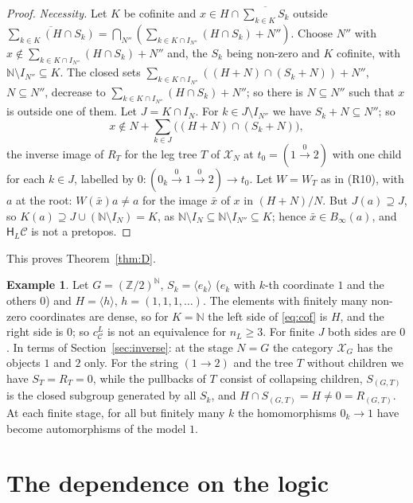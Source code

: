 \documentclass[11pt]{amsart}
\theoremstyle{definition}
\newtheorem{ex}[thm]{Example}
\newcommand{\HH}{\mathsf H}
\newcommand{\cX}{\mathcal X}
\newcommand{\cC}{\mathcal C}
\begin{document}
\begin{proof}
\emph{Necessity.} Let $K$ be cofinite and $x\in H\cap\overline{
\sum_{k\in K}S_k}$ outside $\overline{\sum_{k\in K}(H\cap
S_k)}=\bigcap_{N''}(\sum_{k\in K\cap I_{N''}}(H\cap S_k)+N'')$. Choose
$N''$ with $x\notin\sum_{k\in K\cap I_{N''}}(H\cap S_k)+N''$ and, the
$S_k$ being non-zero and $K$ cofinite, with $\mathbb N\setminus
I_{N''}\subseteq K$. The closed sets $\sum_{k\in K\cap I_{N''}}((H+N)
\cap(S_k+N))+N''$, $N\subseteq N''$, decrease to $\sum_{k\in K\cap
I_{N''}}(H\cap S_k)+N''$; so there is $N\subseteq N''$ such that $x$
is outside one of them. Let $J=K\cap I_N$. For $k\in J\setminus
I_{N''}$ we have $S_k+N\subseteq N''$; so
\[
x\notin N+\sum_{k\in J}\bigl((H+N)\cap(S_k+N)\bigr),
\]
the inverse image of $R_T$ for the leg tree $T$ of $\cX_N$ at
$t_0=(1\xrightarrow{0}2)$ with one child for each $k\in J$, labelled
by $0\colon(0_k\xrightarrow{0}1\xrightarrow{0}2)\to t_0$. Let $W=W_T$
as in (R10), with $a$ at the root: $W(\bar x)a\ne a$ for the image
$\bar x$ of $x$ in $(H+N)/N$. But $J(a)\supseteq J$, so $K(a)\supseteq
J\cup(\mathbb N\setminus I_N)=K$, as $\mathbb N\setminus I_N\subseteq
\mathbb N\setminus I_{N''}\subseteq K$; hence $\bar x\in B_\infty(a)$,
and $\HH_L\cC$ is not a pretopos.
\end{proof}

This proves Theorem~\ref{thm:D}.

\begin{ex}\label{ex:conv}
Let $G=(\mathbb Z/2)^{\mathbb N}$, $S_k=\langle e_k\rangle$ ($e_k$ with
$k$-th coordinate $1$ and the others $0$) and $H=\langle h\rangle$,
$h=(1,1,1,\dots)$. The elements with finitely many non-zero
coordinates are dense, so for $K=\mathbb N$ the left side of
\eqref{eq:cof} is $H$, and the right side is $0$; so $c^L_\cC$ is not
an equivalence for $n_L\ge3$. For finite $J$ both sides are $0$. In
terms of Section~\ref{sec:inverse}: at the stage $N=G$ the category
$\cX_G$ has the objects $1$ and $2$ only. For the string $(1\to2)$ and
the tree $T$ without children we have $S_T=R_T=0$, while the pullbacks
of $T$ consist of collapsing children, $S_{(G,T)}$ is the closed
subgroup generated by all $S_k$, and $H\cap S_{(G,T)}=H\ne0=
R_{(G,T)}$. At each finite stage, for all but finitely many $k$ the
homomorphisms $0_k\to1$ have become automorphisms of the model $1$.
\end{ex}

\section{The dependence on the logic}\label{sec:depth}
\end{document}
